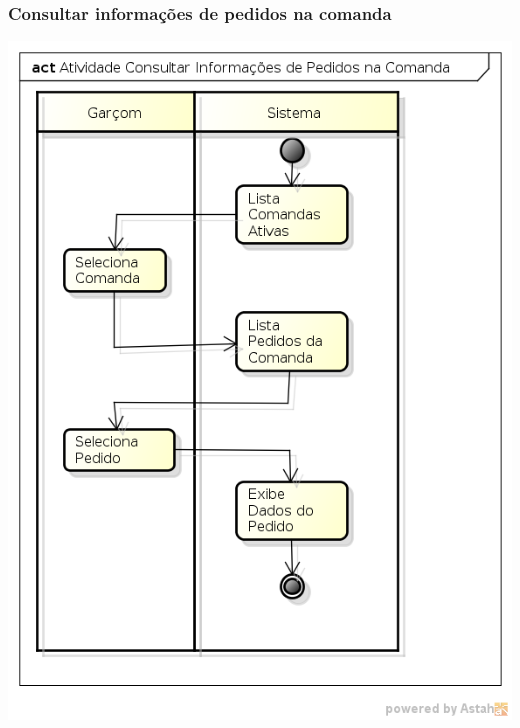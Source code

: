 \subsubsection{Consultar informações de pedidos na comanda}
\centerline{
\includegraphics[scale=0.7]{diagrama/Atividade_Consultar_Informacoes_de_Pedidos_na_Comanda.png}
}

\newpage
